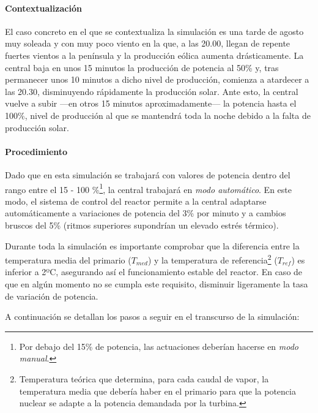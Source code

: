 \paragraph{Contextualización}

El caso concreto en el que se contextualiza la simulación es una tarde de agosto muy soleada y con muy poco viento en la que, a las 20.00, llegan de repente fuertes vientos a la península y la producción eólica aumenta drásticamente. La central baja en unos 15 minutos la producción de potencia al 50\% y, tras permanecer unos 10 minutos a dicho nivel de producción, comienza a atardecer a las 20.30, disminuyendo rápidamente la producción solar. Ante esto, la central vuelve a subir ---en otros 15 minutos aproximadamente--- la potencia hasta el 100\%, nivel de producción al que se mantendrá toda la noche debido a la falta de producción solar.

\paragraph{Procedimiento} \label{procedimiento}

Dado que en esta simulación se trabajará con valores de potencia dentro del rango entre el 15 - 100 \%\footnote{Por debajo del 15\% de potencia, las actuaciones deberían hacerse en \textit{modo manual}.}, la central trabajará en \textit{modo automático}. En este modo, el sistema de control del reactor permite a la central adaptarse automáticamente a variaciones de potencia del 3\% por minuto y a cambios bruscos del 5\% (ritmos superiores supondrían un elevado estrés térmico). 

Durante toda la simulación es importante comprobar que la diferencia entre la temperatura media del primario ($T_{med}$) y la temperatura de referencia\footnote{Temperatura teórica que determina, para cada caudal de vapor, la temperatura media que debería haber en el primario para que la potencia nuclear se adapte a la potencia demandada por la turbina.} ($T_{ref}$) es inferior a 2ºC, asegurando así el funcionamiento estable del reactor. En caso de que en algún momento no se cumpla este requisito, disminuir ligeramente la tasa de variación de potencia.

A continuación se detallan los pasos a seguir en el transcurso de la simulación:

